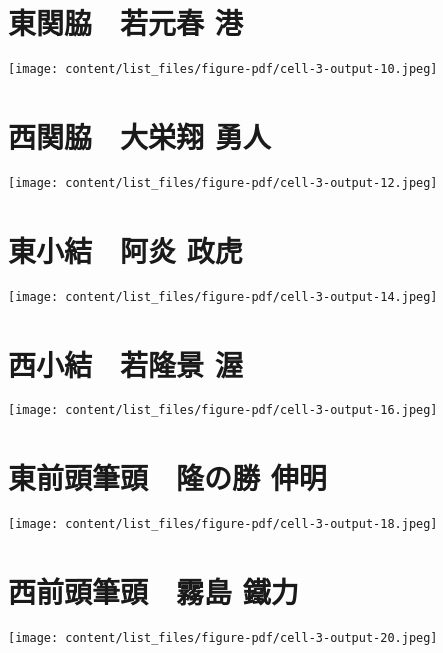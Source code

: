 \documentclass[
  letterpaper,
]{bxjsbook}
\begin{document}
\section{東関脇　若元春
港}\label{ux6771ux95a2ux8107-ux82e5ux5143ux6625-ux6e2f}

\texttt{[image: content/list\_files/figure-pdf/cell-3-output-10.jpeg]}

\section{西関脇　大栄翔
勇人}\label{ux897fux95a2ux8107-ux5927ux6804ux7fd4-ux52c7ux4eba}

\texttt{[image: content/list\_files/figure-pdf/cell-3-output-12.jpeg]}

\section{東小結　阿炎
政虎}\label{ux6771ux5c0fux7d50-ux963fux708e-ux653fux864e}

\texttt{[image: content/list\_files/figure-pdf/cell-3-output-14.jpeg]}

\section{西小結　若隆景
渥}\label{ux897fux5c0fux7d50-ux82e5ux9686ux666f-ux6e25}

\texttt{[image: content/list\_files/figure-pdf/cell-3-output-16.jpeg]}

\section{東前頭筆頭　隆の勝
伸明}\label{ux6771ux524dux982dux7b46ux982d-ux9686ux306eux52dd-ux4f38ux660e}

\texttt{[image: content/list\_files/figure-pdf/cell-3-output-18.jpeg]}

\section{西前頭筆頭　霧島
鐵力}\label{ux897fux524dux982dux7b46ux982d-ux9727ux5cf6-ux9435ux529b}

\texttt{[image: content/list\_files/figure-pdf/cell-3-output-20.jpeg]}
\end{document}
